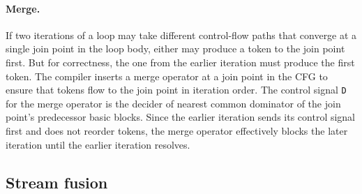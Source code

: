 \paragraph{Merge.}
%
%
If two iterations of a loop may take different control-flow
paths that converge at a single join point in the loop body, either may
produce a token to the join point first.
% 
But for correctness, the one from the
earlier iteration must produce the first token.
%
The compiler inserts a merge operator at a join point in the CFG to ensure that 
tokens flow to the join point in iteration order.
%
The control signal {\tt D} for the merge operator is the decider of
nearest common dominator of the join point's predecessor basic blocks.
%
%
Since the earlier iteration sends its control signal first and \riptide does not reorder tokens, the merge operator effectively blocks the later iteration until the earlier iteration resolves. %
%

\figRipTideArch

\subsection{Stream fusion}
\label{riptide:compiler:stream}

